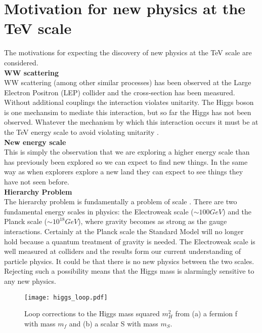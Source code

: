 \section{Motivation for new physics at the TeV scale}

The motivations for expecting the discovery of new physics at the TeV scale are
considered. \\

{\bf WW scattering} \\

WW scattering (among other similar processes) has been observed at the Large 
Electron Positron (LEP) collider and the cross-section has been measured. 
Without additional couplings the interaction violates unitarity. The Higgs boson 
is one mechansim to mediate this interaction, but so far the Higgs has not been 
observed. Whatever the mechanism by which this interaction occurs it must be at 
the TeV energy scale to avoid violating unitarity \cite{halzen_and_martin}. \\

{\bf New energy scale} \\

This is simply the observation that we are exploring a higher energy scale than
has previously been explored so we can expect to find new things. In the same
way as when explorers explore a new land they can expect to see things they
have not seen before. \\

{\bf Hierarchy Problem} \\

The hierarchy problem is fundamentally a problem of scale \cite{dvali}. There 
are two fundamental energy scales in physics: the Electroweak scale 
($\sim100\unit{GeV}$) and the Planck scale ($\sim10^{18}\unit{GeV}$), where 
gravity becomes as strong as the gauge interactions. Certainly at the Planck 
scale the Standard Model will no longer hold because a quantum treatment of 
gravity is needed. The Electroweak scale is well measured at colliders and the 
results form our current understanding of particle physics. It could be that 
there is no new physics between the two scales. Rejecting such a possibility 
means that the Higgs mass is alarmingly sensitive to any new physics. \\

\begin{figure}
\begin{center}
\texttt{[image: higgs\_loop.pdf]}
\end{center}
\caption{Loop corrections to the Higgs mass squared $m_{H}^{2}$ from (a) a 
fermion f with mass $m_{f}$ and (b) a scalar S with mass $m_{S}$.}
\label{fig:higgs_loop}
\end{figure}

